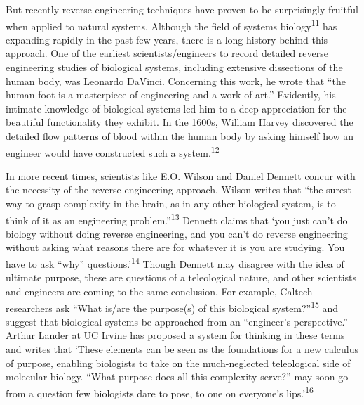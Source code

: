 But recently reverse engineering techniques have proven to be
surprisingly fruitful when applied to natural systems. Although the
field of systems biology\textsuperscript{11} has expanding rapidly in
the past few years, there is a long history behind this approach. One
of the earliest scientists/engineers to record detailed reverse
engineering studies of biological systems, including extensive
dissections of the human body, was Leonardo DaVinci. Concerning this
work, he wrote that “the human foot is a masterpiece of engineering and
a work of art.” Evidently, his intimate knowledge of biological systems
led him to a deep appreciation for the beautiful functionality they
exhibit. In the 1600s, William Harvey discovered the detailed flow
patterns of blood within the human body by asking himself how an
engineer would have constructed such a system.\textsuperscript{12}


In more recent times, scientists like E.O. Wilson and Daniel Dennett
concur with the necessity of the reverse engineering approach. Wilson
writes that “the surest way to grasp complexity in the brain, as in any
other biological system, is to think of it as an engineering
problem.”\textsuperscript{13} Dennett claims that ‘you just can’t do
biology without doing reverse engineering, and you can’t do reverse
engineering without asking what reasons there are for whatever it is
you are studying. You have to ask “why” questions.’\textsuperscript{14}
Though Dennett may disagree with the idea of ultimate purpose, these
are questions of a teleological nature, and other scientists and
engineers are coming to the same conclusion. For example, Caltech
researchers ask “What is/are the purpose(s) of this biological
system?”\textsuperscript{15} and suggest that biological systems be
approached from an “engineer’s perspective.” Arthur Lander at UC Irvine
has proposed a system for thinking in these terms and writes that
‘These elements can be seen as the foundations for a new calculus of
purpose, enabling biologists to take on the much-neglected teleological
side of molecular biology. “What purpose does all this complexity
serve?” may soon go from a question few biologists dare to pose, to one
on everyone’s lips.’\textsuperscript{16} 


